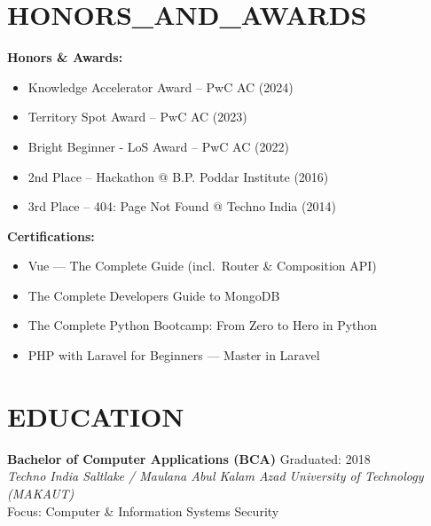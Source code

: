 \documentclass[10pt,letterpaper]{article}
\begin{document}
\section*{HONORS\_AND\_AWARDS}
\noindent\textbf{\color{obsidian}Honors \& Awards:}
\begin{itemize}
    \item Knowledge Accelerator Award -- PwC AC (2024)
    \item Territory Spot Award -- PwC AC (2023)
    \item Bright Beginner - LoS Award -- PwC AC (2022)
    \item 2nd Place -- Hackathon @ B.P. Poddar Institute (2016)
    \item 3rd Place -- 404: Page Not Found @ Techno India (2014)
\end{itemize}

\vspace{1ex}
\noindent\textbf{\color{obsidian}Certifications:}
\begin{itemize}
    \item Vue --- The Complete Guide (incl.\ Router \& Composition API)
    \item The Complete Developers Guide to MongoDB
    \item The Complete Python Bootcamp: From Zero to Hero in Python
    \item PHP with Laravel for Beginners --- Master in Laravel
\end{itemize}

\section*{EDUCATION}
\noindent\textbf{\color{obsidian}Bachelor of Computer Applications (BCA)} \hfill {\small\ttfamily\color{mutedslate}Graduated: 2018} \\
{\small\textit{\color{mutedslate}Techno India Saltlake / Maulana Abul Kalam Azad University of Technology (MAKAUT)}} \\
{\small\color{mutedslate}Focus: Computer \& Information Systems Security}
\end{document}
